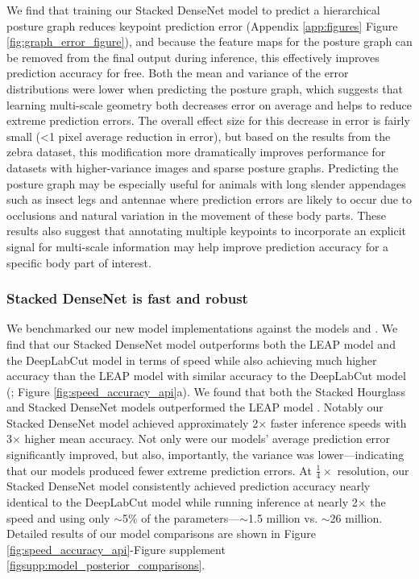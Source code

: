 \documentclass[11pt,a4paper,oneside]{article}
\begin{document}
 We find that training our Stacked DenseNet model to predict a hierarchical posture graph reduces keypoint prediction error (Appendix \ref{app:figures} Figure \ref{fig:graph_error_figure}), and because the feature maps for the posture graph can be removed from the final output during inference, this effectively improves prediction accuracy for free. Both the mean and variance of the error distributions were lower when predicting the posture graph, which suggests that learning multi-scale geometry both decreases error on average and helps to reduce extreme prediction errors. The overall effect size for this decrease in error is fairly small (<1 pixel average reduction in error), but based on the results from the zebra dataset, this modification more dramatically improves performance for datasets with higher-variance images and sparse posture graphs. Predicting the posture graph may be especially useful for animals with long slender appendages such as insect legs and antennae where prediction errors are likely to occur due to occlusions and natural variation in the movement of these body parts. These results also suggest that annotating multiple keypoints to incorporate an explicit signal for multi-scale information may help improve prediction accuracy for a specific body part of interest.

\subsubsection{Stacked DenseNet is fast and robust}
\label{subsec:models}
We benchmarked our new model implementations against the models \citep{pereira2019fast} and \cite{mathis2018deeplabcut}. We find that our Stacked DenseNet model outperforms both the LEAP model \citep{pereira2019fast} and the DeepLabCut model \citep{mathis2018deeplabcut} in terms of speed while also achieving much higher accuracy than the LEAP model \citep{pereira2019fast} with similar accuracy to the DeepLabCut model (\citealt{mathis2018deeplabcut}; Figure \ref{fig:speed_accuracy_api}a). We found that both the Stacked Hourglass and Stacked DenseNet models outperformed the LEAP model \citep{pereira2019fast}. Notably our Stacked DenseNet model achieved approximately 2$\times$ faster inference speeds with 3$\times$ higher mean accuracy. Not only were our models’ average prediction error significantly improved, but also, importantly, the variance was lower—indicating that our models produced fewer extreme prediction errors. At $\tfrac{1}{4}\times$ resolution, our Stacked DenseNet model consistently achieved prediction accuracy nearly identical to the DeepLabCut model \citep{mathis2018deeplabcut} while running inference at nearly 2$\times$ the speed and using only $\sim$5$\%$ of the parameters—$\sim$1.5 million vs. $\sim$26 million. Detailed results of our model comparisons are shown in Figure \ref{fig:speed_accuracy_api}-Figure supplement \ref{figsupp:model_posterior_comparisons}.
\end{document}
